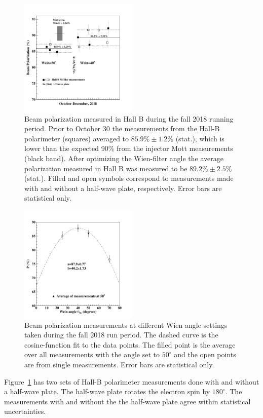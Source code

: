 \begin{figure}[ht]
\begin{center}
\includegraphics[width=0.5\textwidth]{Moller-RGA-2018.pdf}
	\caption{Beam polarization measured in Hall B during the fall 2018 running period. Prior to October 30 the measurements from the 
	Hall-B polarimeter (squares) averaged to $85.9\%\pm1.2\%$ (stat.), which is lower than the expected 90\% from the injector Mott 
	measurements (black band). After optimizing the Wien-filter angle the average polarization measured in Hall B was measured 
	to be $89.2\%\pm2.5\%$ (stat.). Filled and open symbols correspond to measurements made with and without a half-wave plate, 
	respectively. Error bars are statistical only.}
\label{fig:molrga}
\end{center}
\end{figure}

\begin{figure}[ht]
\begin{center}
\includegraphics[width=0.5\textwidth]{Hall-B_fall_spin_dance.pdf}
	\caption{Beam polarization measurements at different Wien angle settings taken during the fall 2018 run period.  The dashed 
	curve is the cosine-function fit to the data points. The filled point is the average over all measurements with the angle set to $50^\circ$ 
	and the open points are from single measurements. Error bars are statistical only. }
\label{fig:sdance}
\end{center}
\end{figure}

Figure~\ref{fig:molrga} has two sets of Hall-B polarimeter measurements done with and without a half-wave plate. The half-wave
plate rotates the electron spin by $180^\circ$. The measurements with and without the the half-wave plate agree within statistical
uncertainties. 

